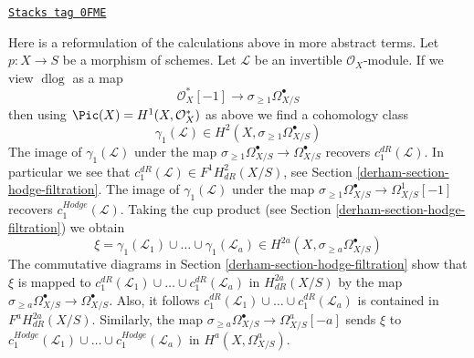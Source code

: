 \begin{remark}[Truncations]
\label{derham-remark-truncations}
\href{https://stacks.math.columbia.edu/tag/0FME}{\texttt{Stacks tag 0FME}}

Here is a reformulation of the calculations above in more abstract terms.
Let $p : X \to S$ be a morphism of schemes. Let $\mathcal{L}$ be an
invertible $\mathcal{O}_X$-module. If we view $\text{d}\log$ as a map
$$
\mathcal{O}_X^*[-1] \to \sigma_{\geq 1}\Omega^\bullet_{X/S}
$$
then using $\Pic(X) = H^1(X, \mathcal{O}_X^*)$ as above we find a
cohomology class
$$
\gamma_1(\mathcal{L}) \in H^2(X, \sigma_{\geq 1}\Omega^\bullet_{X/S})
$$
The image of $\gamma_1(\mathcal{L})$ under the map
$\sigma_{\geq 1}\Omega^\bullet_{X/S} \to \Omega^\bullet_{X/S}$
recovers $c_1^{dR}(\mathcal{L})$. In particular we see that
$c_1^{dR}(\mathcal{L}) \in F^1H^2_{dR}(X/S)$, see
Section \ref{derham-section-hodge-filtration}. The image of $\gamma_1(\mathcal{L})$
under the map $\sigma_{\geq 1}\Omega^\bullet_{X/S} \to \Omega^1_{X/S}[-1]$
recovers $c_1^{Hodge}(\mathcal{L})$. Taking the cup product
(see Section \ref{derham-section-hodge-filtration}) we obtain
$$
\xi = \gamma_1(\mathcal{L}_1) \cup \ldots \cup \gamma_1(\mathcal{L}_a) \in
H^{2a}(X, \sigma_{\geq a}\Omega^\bullet_{X/S})
$$
The commutative diagrams in Section \ref{derham-section-hodge-filtration}
show that $\xi$ is mapped to
$c_1^{dR}(\mathcal{L}_1) \cup \ldots \cup c_1^{dR}(\mathcal{L}_a)$
in $H^{2a}_{dR}(X/S)$ by the map
$\sigma_{\geq a}\Omega^\bullet_{X/S} \to \Omega^\bullet_{X/S}$.
Also, it follows
$c_1^{dR}(\mathcal{L}_1) \cup \ldots \cup c_1^{dR}(\mathcal{L}_a)$
is contained in $F^a H^{2a}_{dR}(X/S)$. Similarly, the map
$\sigma_{\geq a}\Omega^\bullet_{X/S} \to \Omega^a_{X/S}[-a]$
sends $\xi$ to
$c_1^{Hodge}(\mathcal{L}_1) \cup \ldots \cup c_1^{Hodge}(\mathcal{L}_a)$
in $H^a(X, \Omega^a_{X/S})$.
\end{remark}


